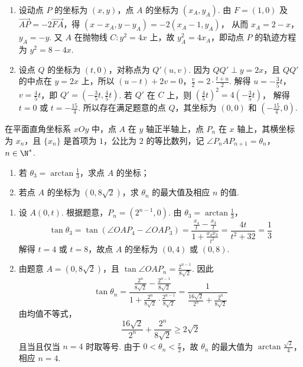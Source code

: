 \begin{solution}
\begin{enumerate}
\item 设动点 \(P\) 的坐标为 \((x,y)\)，点 \(A\) 的坐标为 \((x_A,y_A)\). 由 \(F=(1,0)\) 及 \(\overrightarrow{AP}=-2\overrightarrow{FA}\)，得 \((x-x_A,y-y_A)=-2(x_A-1,y_A)\)，
从而 \(x_A=2-x\)，\(y_A=-y\). 又 \(A\) 在抛物线 \(C:y^2=4x\) 上，故 \(y_A^2=4x_A\)，即动点 \(P\) 的轨迹方程为 \(y^2=8-4x\).

\item 设点 \(Q\) 的坐标为 \((t,0)\)，对称点为 \(Q'(u,v)\). 因为 \(QQ'\perp y=2x\)，且 \(QQ'\) 的中点在 \(y=2x\) 上，所以
\((u-t)+2v=0\)，\(\frac v2=2\cdot\frac{t+u}{2}\).
解得 \(u=-\frac35t\)，\(v=\frac45t\)，即 \(Q'=\left(-\frac35t,\frac45t\right)\). 若 \(Q'\) 在 \(C\) 上，则 \(\left(\frac45t\right)^2=4\left(-\frac35t\right)\)，
解得 \(t=0\) 或 \(t=-\frac{15}{4}\). 所以存在满足题意的点 \(Q\)，其坐标为 \((0,0)\) 和 \(\left(-\frac{15}{4},0\right)\).
\end{enumerate}
\end{solution}

\begin{problem}
在平面直角坐标系 \(xOy\) 中，点 \(A\) 在 \(y\) 轴正半轴上，点 \( P_{n} \) 在 \(x\) 轴上，其横坐标为 \( x_{n} \)，且 \( \{x_{n}\} \) 是首项为 \(1\)，公比为 \(2\) 的等比数列，记 \( \angle P_{n}AP_{n+1} = \theta_{n} \)，\( n \in \N^{*} \).

\begin{enumerate}
\item 若 \( \theta_{3}=\arctan\frac{1}{3} \)，求点 \(A\) 的坐标；
\item 若点 \(A\) 的坐标为 \( (0, 8\sqrt{2}) \)，求 \( \theta_{n} \) 的最大值及相应 \(n\) 的值.
\end{enumerate}

\end{problem}

\begin{solution}
\begin{enumerate}
\item 设 \(A(0,t)\). 根据题意，\(P_n=(2^{n-1},0)\). 由 \(\theta_3=\arctan\frac13\)，
\[
\tan\theta_3=\tan(\angle OAP_4-\angle OAP_3)=\frac{\frac{x_4}{t}-\frac{x_3}{t}}{1+\frac{x_4x_3}{t^2}}=\frac{4t}{t^2+32}=\frac13
\]
解得 \(t=4\) 或 \(t=8\)，故点 \(A\) 的坐标为 \((0,4)\) 或 \((0,8)\).

\item 由题意 \(A=(0,8\sqrt2)\)，且 \(\tan\angle OAP_n=\frac{2^{n-1}}{8\sqrt2}\). 因此
\[
\tan\theta_n=\frac{\frac{2^n}{8\sqrt2}-\frac{2^{n-1}}{8\sqrt2}}{1+\frac{2^n}{8\sqrt2}\cdot\frac{2^{n-1}}{8\sqrt2}}=\frac{1}{\frac{16\sqrt2}{2^n}+\frac{2^n}{8\sqrt2}}
\]
由均值不等式，
\[
\frac{16\sqrt2}{2^n}+\frac{2^n}{8\sqrt2}\ge 2\sqrt2
\]
且当且仅当 \(n=4\) 时取等号. 由于 \(0<\theta_n<\frac\pi2\)，故 \(\theta_n\) 的最大值为 \(\arctan\frac{\sqrt2}{4}\)，相应 \(n=4\).
\end{enumerate}
\end{solution}

